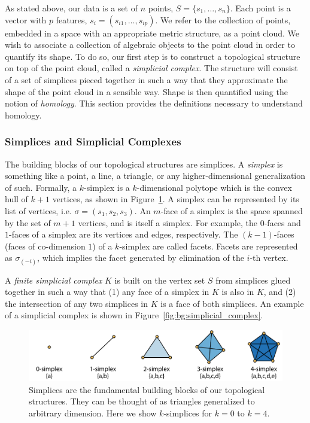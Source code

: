 As stated above, our data is a set of $n$ points, $S=\{s_1,\ldots,s_n\}$.
Each point is a vector with $p$ features, $s_i=(s_{i1},\ldots,s_{ip})$.
We refer to the collection of points, embedded in a space with an appropriate metric structure, as a point cloud.
We wish to associate a collection of algebraic objects to the point cloud in order to quantify its shape.
To do so, our first step is to construct a topological structure on top of the point cloud, called a \emph{simplicial complex}.
The structure will consist of a set of simplices pieced together in such a way that they approximate the shape of the point cloud in a sensible way.
Shape is then quantified using the notion of \emph{homology}.
This section provides the definitions necessary to understand homology.

\subsubsection{Simplices and Simplicial Complexes}
\label{bg:tda:math:simplices}

The building blocks of our topological structures are simplices.
A \emph{simplex} is something like a point, a line, a triangle, or any higher-dimensional generalization of such.
Formally, a $k$-simplex is a $k$-dimensional polytope which is the convex hull of $k+1$ vertices, as shown in Figure~\ref{fig:bg:simplices}.
A simplex can be represented by its list of vertices, i.e. $\sigma=(s_{1},s_{2},s_{3})$.
An $m$-face of a simplex is the space spanned by the set of $m+1$ vertices, and is itself a simplex.
For example, the $0$-faces and $1$-faces of a simplex are its vertices and edges, respectively.
The $(k-1)$-faces (faces of co-dimension $1$) of a $k$-simplex are called facets.
Facets are represented as $\sigma_{(-i)}$, which implies the facet generated by elimination of the $i$-th vertex.

A \emph{finite simplicial complex} $K$ is built on the vertex set $S$ from simplices glued together in such a way that (1) any face of a simplex in $K$ is also in $K$, and (2) the intersection of any two simplices in $K$ is a face of both simplices.
An example of a simplicial complex is shown in Figure~\ref{fig:bg:simplicial_complex}.

\begin{figure}
\centering
\includegraphics[]{./fig/background/simplices.pdf}
\caption[Simplices: The building blocks of topological complexes]{Simplices are the fundamental building blocks of our topological structures. They can be thought of as triangles generalized to arbitrary dimension. Here we show $k$-simplices for $k=0$ to $k=4$.}
\label{fig:bg:simplices}
\end{figure}

